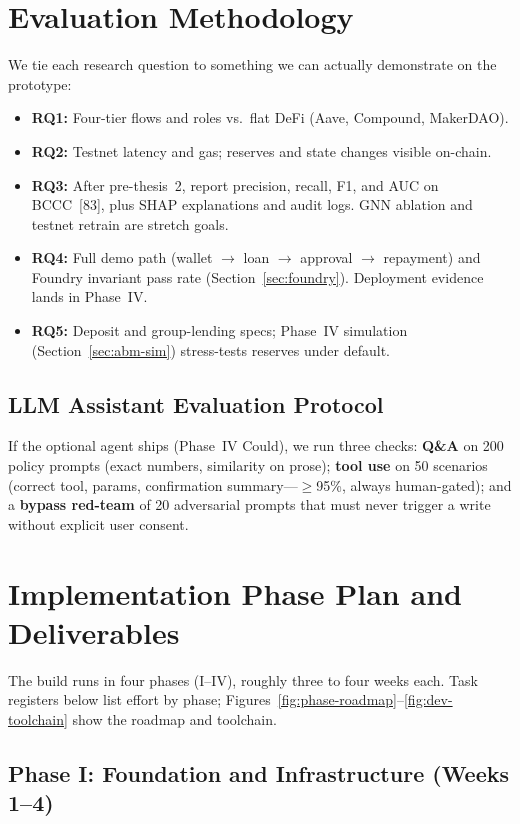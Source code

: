 \documentclass[12pt, a4paper]{report}
\begin{document}
\section{Evaluation Methodology}
\label{sec:eval-method}

We tie each research question to something we can actually demonstrate on the prototype:
\begin{itemize}[noitemsep]
\item \textbf{RQ1:} Four-tier flows and roles vs.\ flat DeFi (Aave, Compound, MakerDAO).
\item \textbf{RQ2:} Testnet latency and gas; reserves and state changes visible on-chain.
\item \textbf{RQ3:} After pre-thesis~2, report precision, recall, F1, and AUC on BCCC~[83], plus SHAP explanations and audit logs. GNN ablation and testnet retrain are stretch goals.
\item \textbf{RQ4:} Full demo path (wallet $\to$ loan $\to$ approval $\to$ repayment) and Foundry invariant pass rate (Section~\ref{sec:foundry}). Deployment evidence lands in Phase~IV.
\item \textbf{RQ5:} Deposit and group-lending specs; Phase~IV simulation (Section~\ref{sec:abm-sim}) stress-tests reserves under default.
\end{itemize}

\subsection{LLM Assistant Evaluation Protocol}
\label{sec:llm-eval}

If the optional agent ships (Phase~IV Could), we run three checks: \textbf{Q\&A} on 200 policy prompts (exact numbers, similarity on prose); \textbf{tool use} on 50 scenarios (correct tool, params, confirmation summary---$\geq$95\%, always human-gated); and a \textbf{bypass red-team} of 20 adversarial prompts that must never trigger a write without explicit user consent.

\section{Implementation Phase Plan and Deliverables}

The build runs in four phases (I--IV), roughly three to four weeks each. Task registers below list effort by phase; Figures~\ref{fig:phase-roadmap}--\ref{fig:dev-toolchain} show the roadmap and toolchain.

\subsection{Phase I: Foundation and Infrastructure (Weeks 1--4)}
\end{document}

